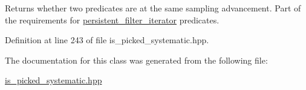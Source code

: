 Returns whether two predicates are at the same sampling advancement. Part of the requirements for \hyperlink{classtrsl_1_1persistent__filter__iterator}{persistent\_\-filter\_\-iterator} predicates. 

Definition at line 243 of file is\_\-picked\_\-systematic.hpp.

The documentation for this class was generated from the following file:\begin{DoxyCompactItemize}
\item 
\hyperlink{is__picked__systematic_8hpp}{is\_\-picked\_\-systematic.hpp}\end{DoxyCompactItemize}
